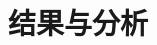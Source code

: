 \documentclass[aps,pre,12pt,preprint,%
	onecolumn,showpacs,showkeys,nofootinbib]{revtex4-2}
\begin{document}
\section{结果与分析}
%	
%	
\end{document}
